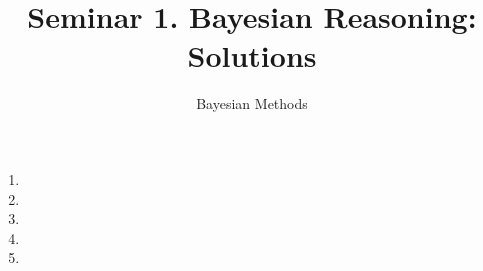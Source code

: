\documentclass[11pt]{article}
\title{Seminar 1. Bayesian Reasoning: Solutions}
\author{Bayesian Methods}
\date{}
\begin{document}
\maketitle
\vspace{-2em}

\begin{enumerate}[label=\arabic*., ref=\arabic*]
  \item 
  \clearpage
  \item 
  \clearpage
  \item 
  \clearpage
  \item 
  \clearpage
  \item 
\end{enumerate}
\end{document}

